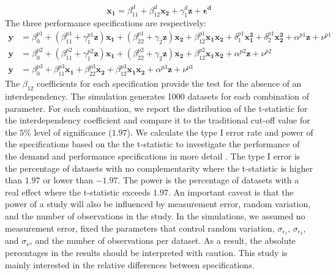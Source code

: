 \documentclass[12pt]{article}
\begin{document}
\begin{equation*}
\mathbf{x_1} = \beta^d_{11} + \beta^d_{12} \mathbf{x_2} + \gamma_1^d \mathbf{z} 
		+ \mathbf{\epsilon^d}
\end{equation*}
The three performance specifications are respectively: 
\begin{align*}
\mathbf{y} &=  \beta^{p1}_0 + (\beta^{p1}_{11} + \gamma_1^{p1} \mathbf{z} )\mathbf{x_1} 
						+ (\beta_{22}^{p1} + \gamma_2 \mathbf{z} ) \mathbf{x_2} 
                        + \beta_{12}^{p1} \mathbf{x_1} \mathbf{x_2} 
                        + \delta_1^{p1} \mathbf{x^2_1} + \delta_2^{p1} \mathbf{x^2_2} 
                        + \alpha^{p1} \mathbf{z}
                        + \nu^{p1} \\
 \mathbf{y} &=  \beta^{p2}_0 + (\beta^{p2}_{11} + \gamma_1^{p2} \mathbf{z} )\mathbf{x_1} 
						+ (\beta_{22}^{p2} + \gamma_2 \mathbf{z} ) \mathbf{x_2} 
                        + \beta_{12}^{p2} \mathbf{x_1} \mathbf{x_2} 
                        + \alpha^{p2} \mathbf{z}
                        + \nu^{p2} \\
 \mathbf{y} &=  \beta^{p3}_0 + \beta^{p3}_{11} \mathbf{x_1} 
						+ \beta_{22}^{p3} \mathbf{x_2} 
                        + \beta_{12}^{p3} \mathbf{x_1} \mathbf{x_2} 
                        + \alpha^{p3} \mathbf{z}
                        + \nu^{p3}
\end{align*}
The $\beta_{12}$ coefficients for each specification provide the test for the absence of an interdependency. The simulation generates 1000 datasets for each combination of parameter. For each combination, we report the distribution of the t-statistic for the interdependency coefficient and compare it to the traditional cut-off value for the $5\%$ level of significance ($1.97$). We calculate the type I error rate and power of the specifications based on the the t-statistic to investigate the performance of the demand and performance specifications in more detail . The type I error is the percentage of datasets with no complementarity where the t-statistic is higher than \(1.97\) or lower than \(-1.97\). The power is the percentage of datasets with a real effect where the t-statistic exceeds \(1.97\). An important caveat is that the power of a study will also be influenced by measurement error, random variation, and the number of observations in the study. In the simulations, we assumed no measurement error, fixed the parameters that control random variation, \(\sigma_{\epsilon_1}\), \(\sigma_{\epsilon_2}\), and \(\sigma_{\nu}\), and the number of observations per dataset. As a result, the absolute percentages in the results should be interpreted with caution. This study is mainly interested in the relative differences between specifications. 
\end{document}
